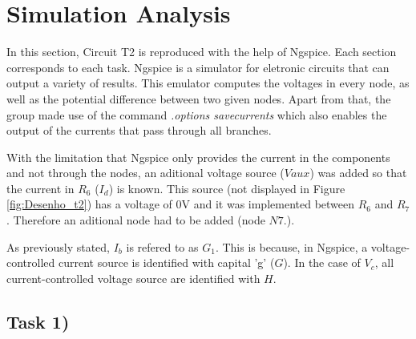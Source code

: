 
\section{Simulation Analysis}
\label{sec:simulation}



In this section, Circuit T2 is reproduced with the help of Ngspice. Each section corresponds
to each task. Ngspice is a simulator for eletronic circuits that can output a variety of results.
This emulator computes the voltages in every node, as well as the potential difference
between two given nodes. Apart from that, the group made use of the command
{\em .options savecurrents} which also enables the output of the currents that pass
through all branches.

With the limitation that Ngspice only provides the current in the components and not through
the nodes, an aditional voltage source ($Vaux$) was added so that the current in $R_6$ ($I_d$)
is known. This source (not displayed in Figure \ref{fig:Desenho_t2}) has a voltage of 0V and it 
was implemented between $R_6$ and $R_7$. Therefore an aditional node had to be added (node $N7.$).

As previously stated, $I_b$ is refered to as $G_1$. This is because, in Ngspice, a
voltage-controlled current source is identified with capital 'g' ($G$). In the case of
$V_c$, all current-controlled voltage source are identified with $H$.




\subsection{Task 1)}
\label{subsec:task1}



